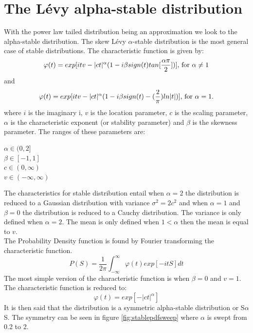 \section{The Lévy alpha-stable distribution}
With the power law tailed distribution being an approximation we look to the alpha-stable distribution. The skew Lévy $\alpha$-stable distribution is the most general case of stable distributions. The characteristic function is given by:
\begin{equation}
\varphi (t) = exp[itv - |ct|^{\alpha} (1-i\beta sign(t) tan[\frac{\alpha \pi}{2}])] $, for $ \alpha \neq 1
\end{equation}
and
\begin{equation}
\varphi (t) = exp[itv - |ct|^{\alpha} (1-i\beta sign(t) -(\frac{2}{\pi})ln|t|)] $, for $ \alpha = 1.
\end{equation}
where $i$ is the imaginary i, $v$ is the location parameter, $c$ is the scaling parameter, $\alpha$ is the characteristic exponent (or stability parameter) and $\beta$ is the skewness parameter. The ranges of these parameters are:\\
\begin{center}
$\alpha \in (0, 2]$\\
$\beta \in [-1, 1]$\\
$c \in (0, \infty)$\\
$v \in (-\infty, \infty)$\\
\end{center}
The characteristics for stable distribution entail when $\alpha = 2$ the distribution is reduced to a Gaussian distribution with variance $\sigma^2 = 2c^2$ and when $\alpha = 1$ and $\beta = 0$ the distribution is reduced to a Cauchy distribution. The variance is only defined when $\alpha = 2$. The mean is only defined when $1 < \alpha $ then the mean is equal to $v$.\\
The Probability Density function is found by Fourier transforming the characteristic function.\\
\begin{equation}
P(S) = \frac{1}{2\pi}\int_{-\infty}^{\infty} \varphi(t) exp[-itS] dt
\label{eq:fourier}
\end{equation}
The most simple version of the characteristic function is when $\beta = 0$ and $v = 1$. The characteristic function is reduced to:
\begin{equation}
\varphi (t) = exp[- |ct|^{\alpha}]
\label{eq:reducedcharfunc}
\end{equation}
It is then said that the distribution is a symmetric alpha-stable distribution or S$\alpha$S. The symmetry can be seen in figure \ref{fig:stablepdfsweep} where $\alpha$ is swept from 0.2 to 2. 
